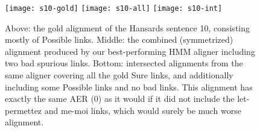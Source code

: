 \documentclass{article}
\begin{document}
\begin{figure}[h]
\begin{center}
    \texttt{[image: s10-gold]}
    \texttt{[image: s10-all]}
    \texttt{[image: s10-int]}
\end{center}
\caption{
    Above: the gold alignment of the Hansards sentence 10, consisting mostly of Possible links. Middle: the combined (symmetrized) alignment produced by our best-performing HMM aligner including two bad spurious links. Bottom: intersected alignments from the same aligner covering all the gold Sure links, and additionally including some Possible links and no bad links. This alignment has exactly the same AER (0) as it would if it did not include the let-permettez and me-moi links, which would surely be much worse alignment.
}
\label{fig:links}
\end{figure}

{}

\end{document}
